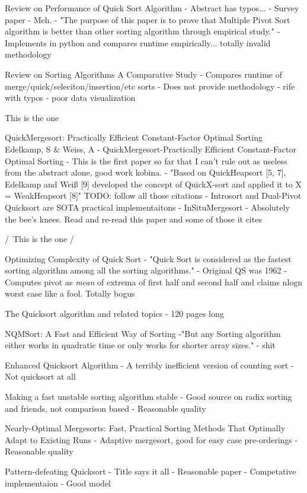 \documentclass{juliacon}
\begin{document}
Review on Performance of Quick Sort Algorithm
  - Abstract has typos...
  - Survey paper
  - Meh.
  - "The purpose of this paper is to prove that Multiple Pivot Sort algorithm is better than other sorting algorithm through empirical study."
  - Implements in python and compares runtime empirically... totally invalid methodology

Review on Sorting Algorithms A Comparative Study
  - Compares runtime of merge/quick/seleciton/insertion/etc sorts
  - Does not provide methodology
  - rife with typos
  - poor data visualization

\/ \/ \/ \/ This is the one \/

QuickMergesort: Practically Efficient Constant-Factor Optimal Sorting
Edelkamp, S & Weiss, A - QuickMergesort-Practically Efficient Constant-Factor Optimal Sorting
  - This is the first paper so far that I can't rule out as useless from the abstract alone, good work kobina.
  - "Based on QuickHeapsort [5, 7], Edelkamp and Weiß [9] developed the concept of QuickX-sort and applied it to X = WeakHeapsort [8]" TODO: follow all those citations
  - Introsort and Dual-Pivot Quicksort are SOTA practical implementaitons
  - InSituMergesort
  - Absolutely the bee's knees. Read and re-read this paper and some of those it cites

/\/\/\/\ This is the one /\

Optimizing Complexity of Quick Sort
  - "Quick Sort is considered as the fastest sorting algorithm among all the sorting algorithms."
  - Original QS was 1962
  - Computes pivot as \textit{mean} of extrema of first half and second half and claims nlogn worst case like  a fool. Totally bogus

The Quicksort algorithm
and related topics
  - 120 pages long

NQMSort: A Fast and Efficient Way of Sorting
  -"But any Sorting algorithm either works in quadratic time or only works for shorter array sizes."
  - shit

Enhanced Quicksort Algorithm
  - A terribly inefficient version of counting sort
  - Not quicksort at all

Making a fast unstable sorting algorithm stable
  - Good source on radix sorting and friends, not comparison based
  - Reasonable quality

Nearly-Optimal Mergesorts:
Fast, Practical Sorting Methods That
Optimally Adapt to Existing Runs
  - Adaptive mergesort, good for easy case pre-orderings
  - Reasonable quality

Pattern-defeating Quicksort
  - Title says it all
  - Reasonable paper
  - Competative implementaion
  - Good model
\end{document}

